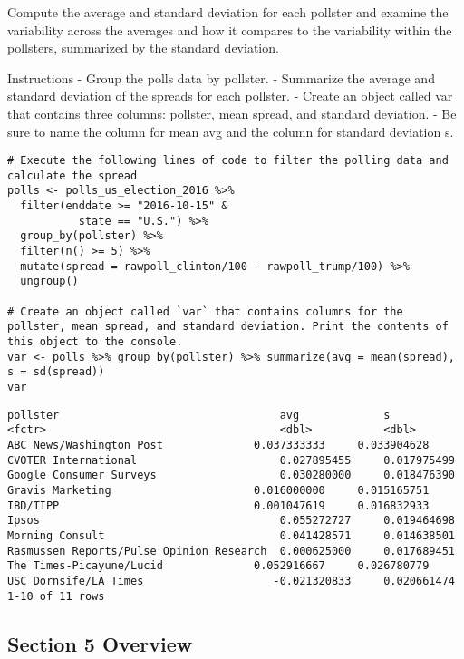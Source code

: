 \documentclass[
]{article}
\begin{document}
Compute the average and standard deviation for each pollster and examine
the variability across the averages and how it compares to the
variability within the pollsters, summarized by the standard deviation.

Instructions - Group the polls data by pollster. - Summarize the average
and standard deviation of the spreads for each pollster. - Create an
object called var that contains three columns: pollster, mean spread,
and standard deviation. - Be sure to name the column for mean avg and
the column for standard deviation s.

\begin{verbatim}
# Execute the following lines of code to filter the polling data and calculate the spread
polls <- polls_us_election_2016 %>% 
  filter(enddate >= "2016-10-15" &
           state == "U.S.") %>%
  group_by(pollster) %>%
  filter(n() >= 5) %>% 
  mutate(spread = rawpoll_clinton/100 - rawpoll_trump/100) %>%
  ungroup()

# Create an object called `var` that contains columns for the pollster, mean spread, and standard deviation. Print the contents of this object to the console.
var <- polls %>% group_by(pollster) %>% summarize(avg = mean(spread), s = sd(spread))
var
\end{verbatim}

\begin{verbatim}
pollster                                  avg             s
<fctr>                                    <dbl>           <dbl>
ABC News/Washington Post              0.037333333     0.033904628
CVOTER International                      0.027895455     0.017975499
Google Consumer Surveys                   0.030280000     0.018476390
Gravis Marketing                      0.016000000     0.015165751
IBD/TIPP                              0.001047619     0.016832933
Ipsos                                     0.055272727     0.019464698
Morning Consult                           0.041428571     0.014638501
Rasmussen Reports/Pulse Opinion Research  0.000625000     0.017689451
The Times-Picayune/Lucid              0.052916667     0.026780779
USC Dornsife/LA Times                    -0.021320833     0.020661474
1-10 of 11 rows
\end{verbatim}

\hypertarget{section-5-overview}{%
\subsection{Section 5 Overview}\label{section-5-overview}}
\end{document}
